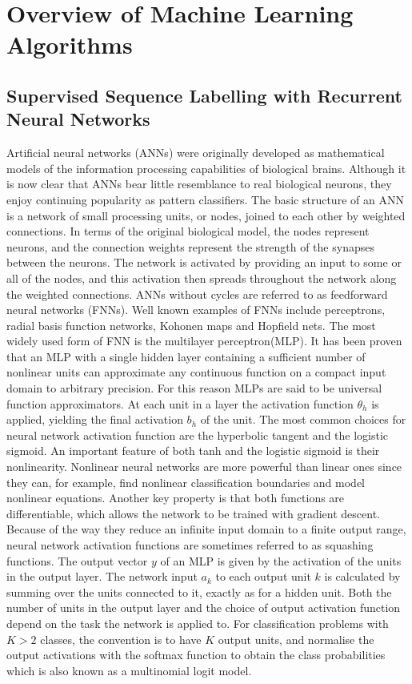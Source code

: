 \section{Overview of Machine Learning Algorithms}
\subsection{Supervised Sequence Labelling with Recurrent Neural Networks \cite{Graves}}
Artificial neural networks (ANNs) were originally developed as mathematical models of the information processing capabilities of biological brains. Although it is now clear that ANNs bear little resemblance to real biological neurons, they enjoy continuing popularity as pattern classifiers. The basic structure of an ANN is a network of small processing units, or nodes, joined to each other by weighted connections. In terms of the original biological model, the nodes represent neurons, and the connection weights represent the strength of the synapses between the neurons. The network is activated by providing an input to some or all of the nodes, and this activation then spreads throughout the network along the weighted connections. ANNs without cycles are referred to as feedforward neural networks (FNNs). Well known examples of FNNs include perceptrons, radial basis function networks, Kohonen maps and Hopfield nets. The most widely used form of FNN is the multilayer perceptron(MLP). It has been proven that an MLP with a single hidden layer containing a sufficient number of nonlinear units can approximate any continuous function on a compact input domain to arbitrary precision. For this reason MLPs are said to be universal function approximators.
At each unit in a layer the activation function $\theta_h$ is applied, yielding the final activation $b_h$ of the unit. The most common choices for neural network activation function are the hyperbolic tangent and the logistic sigmoid. An important feature of both tanh and the logistic sigmoid is their nonlinearity. Nonlinear neural networks are more powerful than linear ones since they can, for example, find nonlinear classification boundaries and model nonlinear equations. Another key property is that both functions are differentiable, which allows the network to be trained with gradient descent. Because of the way they reduce an infinite input domain to a finite output range, neural network activation functions are sometimes referred to as squashing functions. The output vector $y$ of an MLP is given by the activation of the units in the output layer. The network input $a_k$ to each output unit $k$ is calculated by summing over the units connected to it, exactly as for a hidden unit. Both the number of units in the output layer and the choice of output activation function depend on the task the network is applied to. For classification problems with $K > 2$ classes, the convention is to have $K$ output units, and normalise the output activations with the softmax function to obtain the class probabilities which is also known as a multinomial logit model.
